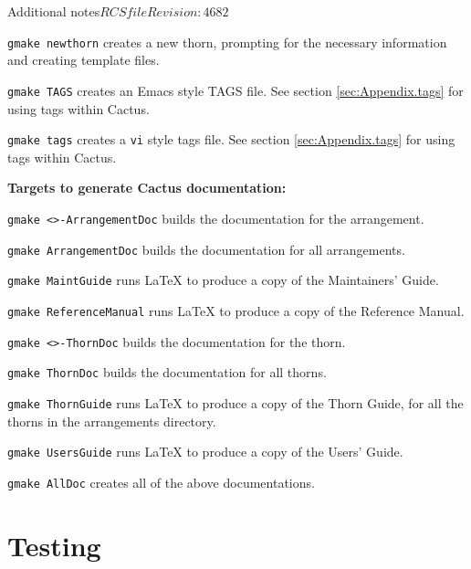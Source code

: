 \begin{cactuspart}{Additional notes}{$RCSfile$}{$Revision: 4682 $}
\begin{Lentry}
\item [\texttt{gmake newthorn}] creates a new thorn, prompting for the necessary
  information and creating template files.

\item [\texttt{gmake TAGS}] creates an Emacs style TAGS file. See section
  \ref{sec:Appendix.tags} for using tags within Cactus.

\item [\texttt{gmake tags}] creates a \texttt{vi} style tags file. See section
  \ref{sec:Appendix.tags} for using tags within Cactus.

\end{Lentry}

{\bf Targets to generate Cactus documentation:}
\label{sec:OtherGmakeTargetsDoc}

\begin{Lentry}

\item[\texttt{gmake <\var{arrangement}>-ArrangementDoc}] builds the
documentation for the arrangement.

\item[\texttt{gmake ArrangementDoc}] builds the documentation for all
arrangements.

\item [\texttt{gmake MaintGuide}] runs LaTeX to produce a copy of the
Maintainers' Guide.

\item [\texttt{gmake ReferenceManual}] runs LaTeX to produce a copy of the
Reference Manual.

\item[\texttt{gmake <\var{thorn}>-ThornDoc}] builds the documentation for the
thorn.

\item[\texttt{gmake ThornDoc}] builds the documentation for all thorns.

\item [\texttt{gmake ThornGuide}] runs LaTeX to produce a copy of the Thorn
Guide, for all the thorns in the arrangements directory.

\item [\texttt{gmake UsersGuide}] runs LaTeX to produce a copy of the Users'
Guide.

\item [\texttt{gmake AllDoc}] creates all of the above documentations.

\end{Lentry}


\section{Testing}
\label{sec:testing}


\end{cactuspart}
